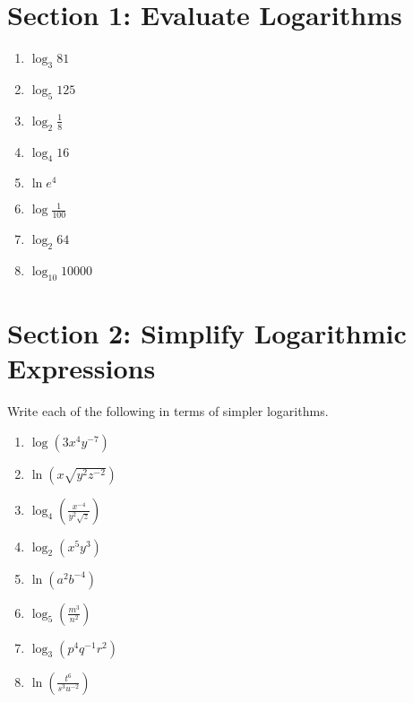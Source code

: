 \documentclass{hw}
\begin{document}
\section*{\normalsize Section 1: Evaluate Logarithms}
\begin{enumerate}[label=\alph*.]
    \item $ \log_3 81 $
        \studentlargeworkspace
    \item $ \log_5 125 $
        \studentlargeworkspace
    \item $ \log_2 \frac{1}{8} $
        \studentlargeworkspace
    \item $ \log_4 16 $
        \studentlargeworkspace
    \item $ \ln e^4 $
        \studentlargeworkspace
    \item $ \log \frac{1}{100} $
        \studentlargeworkspace
    \item $ \log_2 64 $
        \studentlargeworkspace
    \item $ \log_{10} 10000 $
        \studentlargeworkspace
\end{enumerate}

\section*{\normalsize Section 2: Simplify Logarithmic Expressions}
Write each of the following in terms of simpler logarithms.
\begin{enumerate}[label=\alph*.]
    \item $ \log (3x^4 y^{-7}) $
        \studentlargeworkspace
    \item $ \ln (x \sqrt{y^2 z^{-2}}) $
        \studentlargeworkspace
    \item $ \log_4 \left( \frac{x^{-4}}{y^2 \sqrt{z}} \right) $
        \studentlargeworkspace
    \item $ \log_2 (x^5 y^3) $
        \studentlargeworkspace
    \item $ \ln (a^2 b^{-4}) $
        \studentlargeworkspace
    \item $ \log_5 \left( \frac{m^3}{n^2} \right) $
        \studentlargeworkspace
    \item $ \log_3 (p^4 q^{-1} r^2) $
        \studentlargeworkspace
    \item $ \ln \left( \frac{t^6}{s^3 u^{-2}} \right) $
        \studentlargeworkspace
\end{enumerate}
\end{document}
